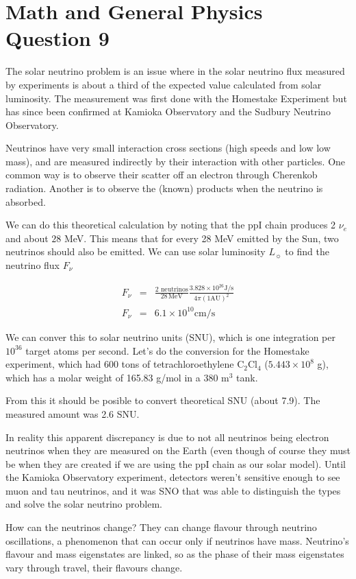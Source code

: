 \documentclass[a4paper,11pt]{scrartcl}
\begin{document}
\section*{Math and General Physics Question 9}

The solar neutrino problem is an issue where in the solar neutrino flux measured by experiments is about a third of the expected value calculated from solar luminosity. The measurement was first done with the Homestake Experiment but has since been confirmed at Kamioka Observatory and the Sudbury Neutrino Observatory.

Neutrinos have very small interaction cross sections (high speeds and low low mass), and are measured indirectly by their interaction with other particles. One common way is to observe their scatter off an electron through Cherenkob radiation. Another is to observe the (known) products when the neutrino is absorbed.


We can do this theoretical calculation by noting that the ppI chain produces 2 $\nu_e$ and about $28$ MeV. This means that for every 28 MeV emitted by the Sun, two neutrinos should also be emitted. We can use solar luminosity $L_{\sun}$ to find the neutrino flux $F_{\nu}$

\begin{eqnarray}
F_{\nu} &=& \frac{2\mathrm{\,\,neutrinos}}{28 \mathrm{\,MeV}}\frac{3.828\times10^{26} \mathrm{J/s}}{4\pi(1\mathrm{AU})^2}\\
F_{\nu} &=& 6.1\times10^{10} \mathrm{cm/s}
\end{eqnarray}

We can conver this to solar neutrino units (SNU), which is one integration per $10^{36}$ target atoms per second. Let's do the conversion for the Homestake experiment, which had 600 tons of tetrachloroethylene $\mathrm{C}_2\mathrm{Cl}_4$ ($5.443\times10^8$ g), which has a molar weight of 165.83 g/mol in a 380 $\mathrm{m}^3$ tank. 

From this it should be posible to convert theoretical SNU (about 7.9). The measured amount was 2.6 SNU.

In reality this apparent discrepancy is due to not all neutrinos being electron neutrinos when they are measured on the Earth (even though of course they must be when they are created if we are using the ppI chain as our solar model). Until the Kamioka Observatory experiment, detectors weren't sensitive enough to see muon and tau neutrinos, and it was SNO that was able to distinguish the types and solve the solar neutrino problem.

How can the neutrinos change? They can change flavour through neutrino oscillations, a phenomenon that can occur only if neutrinos have mass. Neutrino's flavour and mass eigenstates are linked, so as the phase of their mass eigenstates vary through travel, their flavours change.
\end{document}
